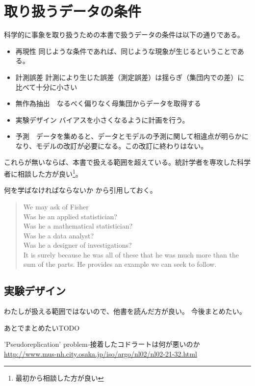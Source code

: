\chapter{取り扱うデータの条件}
科学的に事象を取り扱うための本書で扱うデータの条件は以下の通りである。

\begin{itemize}
    \item 再現性 同じような条件であれば、同じような現象が生じるということである。
    \item 計測誤差  計測により生じた誤差（測定誤差）は揺らぎ（集団内での差）に比べて十分に小さい
    \item 無作為抽出　なるべく偏りなく母集団からデータを取得する%
    \item 実験デザイン バイアスを小さくなるように計画を行う。
    \item 予測　データを集めると、データとモデルの予測に関して相違点が明らかになり、モデルの改訂が必要になる。この改訂に終わりはない。
\end{itemize}
これらが無いならば、本書で扱える範囲を超えている。統計学者を専攻した科学者に相談した方が良い\footnote{最初から相談した方が良い}。



\begin{SMbox}{何を学ばなければならないか}
    \cite{box1976science}から引用しておく。
    \begin{quote}
        We may ask of Fisher \\
        Was he an applied statistician? \\
        Was he a mathematical statistician?  \\
        Was he a data analyst? \\
        Was he a designer of investigations?\\
        It is surely because he was all of these that he was much more than the sum of the parts. He provides an example we can seek to follow. 
    \end{quote}
\end{SMbox}

\section{実験デザイン}
わたしが扱える範囲ではないので、他書を読んだ方が良い。
今後まとめたい。
\begin{SMbox}{あとでまとめたいTODO}

    'Pseudoreplication' problem‐接着したコドラートは何が悪いのか
 \url{http://www.mus-nh.city.osaka.jp/iso/argo/nl02/nl02-21-32.html}
\end{SMbox}

